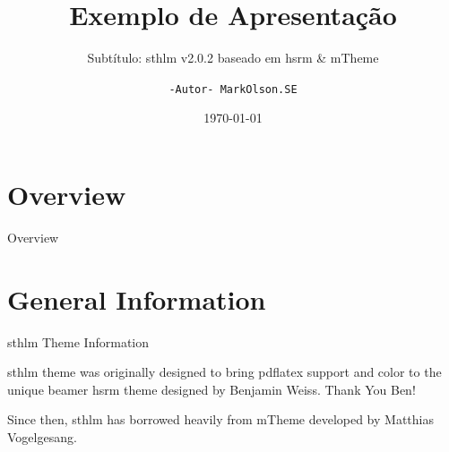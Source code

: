 \documentclass[newPxFont,numfooter,sectionpages]{beamer}
\title{Exemplo de Apresentação}
\subtitle{Subtítulo: sthlm v2.0.2 baseado em hsrm \& mTheme}
\date{\today}
\author{\texttt{-Autor- MarkOlson.SE}}
\institute{Universidade de Brasília \par \small{File: \jobname}}
\begin{document}
%
%

\maketitle

\begingroup
{}


%
%

\section*{Overview}
\begin{frame}{Overview}
\tableofcontents[hideallsubsections]
\end{frame}

%
%

\section{General Information}


\begin{frame}[c]{sthlm Theme Information}

\alert{sthlm} theme was originally designed to bring pdflatex support and color to the unique beamer \alert{hsrm} theme designed by Benjamin Weiss.  Thank You Ben!   

\begin{center}
\end{center}

Since then, \alert{sthlm} has borrowed heavily from \alert{mTheme} developed by Matthias Vogelgesang.  

\end{frame}


\end{document}
